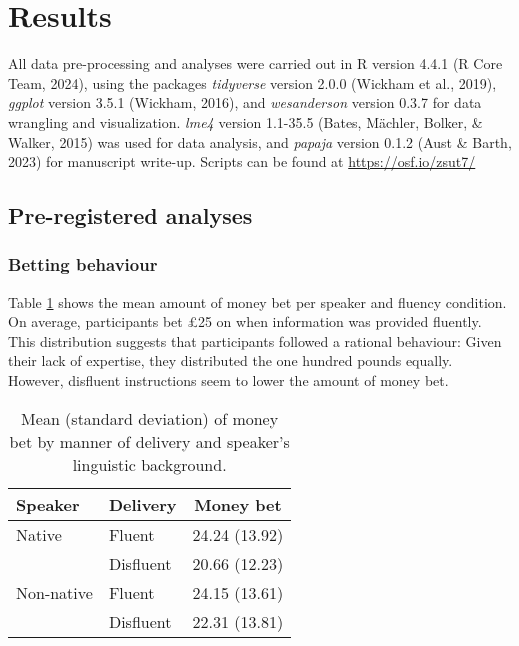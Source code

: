 \documentclass[
  man,floatsintext]{apa7}
\begin{document}
\hypertarget{results}{%
\section{Results}\label{results}}

All data pre-processing and analyses were carried out in R version 4.4.1 (R Core Team, 2024), using the packages \emph{tidyverse} version 2.0.0 (Wickham et al., 2019), \emph{ggplot} version 3.5.1 (Wickham, 2016), and \emph{wesanderson} version 0.3.7 for data wrangling and visualization. \emph{lme4} version 1.1-35.5 (Bates, Mächler, Bolker, \& Walker, 2015) was used for data analysis, and \emph{papaja} version 0.1.2 (Aust \& Barth, 2023) for manuscript write-up. Scripts can be found at \url{https://osf.io/zsut7/}

\hypertarget{pre-registered-analyses}{%
\subsection{Pre-registered analyses}\label{pre-registered-analyses}}

\hypertarget{betting-behaviour}{%
\subsubsection{Betting behaviour}\label{betting-behaviour}}

Table \ref{tab:tab-dist-money} shows the mean amount of money bet per speaker and fluency condition. On average, participants bet £25 on when information was provided fluently. This distribution suggests that participants followed a rational behaviour: Given their lack of expertise, they distributed the one hundred pounds equally. However, disfluent instructions seem to lower the amount of money bet.

\begin{table}[tbp]

\begin{center}
\begin{threeparttable}

\caption{\label{tab:tab-dist-money}Mean (standard deviation) of money bet by manner of delivery and speaker’s linguistic
background.}

\begin{tabular}{lll}
\toprule
Speaker & \multicolumn{1}{c}{Delivery} & \multicolumn{1}{c}{Money bet}\\
\midrule
Native & Fluent & 24.24 (13.92)\\
 & Disfluent & 20.66 (12.23)\\
Non-native & Fluent & 24.15 (13.61)\\
 & Disfluent & 22.31 (13.81)\\
\bottomrule
\end{tabular}

\end{threeparttable}
\end{center}

\end{table}
\end{document}
